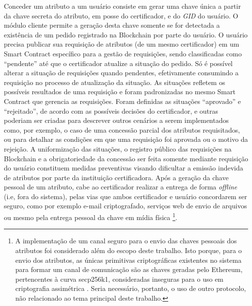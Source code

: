 \documentclass[a4paper,11pt]{article}
\begin{document}
Conceder um atributo a um usuário consiste em gerar uma chave única a partir da chave secreta do atributo, em posse do certificador, e do \emph{GID} do usuário.
O módulo cliente permite a geração desta chave somente se for detectada a existência de um pedido registrado na Blockchain por parte do usuário.
O usuário precisa publicar sua requisição de atributos (de um mesmo certificador) em um Smart Contract específico para a gestão de requisições, sendo classificadas como ``pendente'' até que o certificador atualize a situação do pedido.
Só é possível alterar a situação de requisições quando pendentes, efetivamente consumindo a requisição no processo de atualização da situação.
As situações refletem os possíveis resultados de uma requisição e foram padronizadas no mesmo Smart Contract que gerencia as requisições.
Foram definidas as situações ``aprovado'' e ``rejeitado'', de acordo com as possíveis decisões do certificador, e outras poderiam ser criadas para descrever outros cenários a serem implementados como, por exemplo, o caso de uma concessão parcial dos atributos requisitados, ou para detalhar as condições em que uma requisição foi aprovada ou o motivo da rejeição.
A uniformização das situações, o registro público das requisições na Blockchain e a obrigatoriedade da concessão ser feita somente mediante requisição do usuário constituem medidas preventivas visando dificultar a emissão indevida de atributos por parte da instituição certificadora.
Após a geração da chave pessoal de um atributo, cabe ao certificador realizar a entrega de forma \emph{offline} (i.e, fora do sistema), pelas vias que ambos certificador e usuário concordarem ser seguro, como por exemplo e-mail criptografado, serviços web de envio de arquivos ou mesmo pela entrega pessoal da chave em mídia física
\footnote{A implementação de um canal seguro para o envio das chaves pessoais dos atributos foi considerado além do escopo deste trabalho. Isto porque, para o envio dos atributos, as únicas primitivas criptográficas existentes no sistema para formar um canal de comunicação são as chaves geradas pelo Ethereum, pertencentes à curva secp256k1, consideradas inseguras para o uso em criptografia assimétrica \cite{Bernstein2017}. Seria necessário, portanto, o uso de outro protocolo, não relacionado ao tema principal deste trabalho.}.
\end{document}
